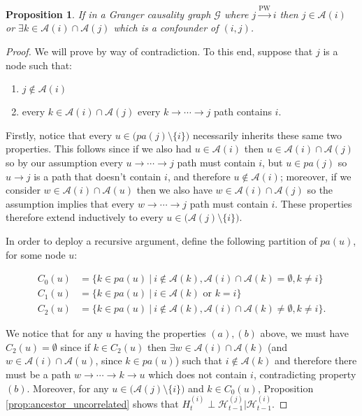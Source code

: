 \documentclass{statsoc}
\def\pwgc{\overset{\text{PW}}{\rightarrow}}  %
\def\gcg{\mathcal{G}}  %
\def\H{\mathcal{H}}  %
\newcommand{\pa}[1]{pa(#1)}  %
\newcommand{\anc}[1]{\mathcal{A}(#1)}  %
\newcommand{\gcgpath}[2]{#1 \rightarrow \cdots \rightarrow #2}  %
\newtheorem{proposition}{Proposition}
\def\H{\mathcal{H}}  %
\begin{document}
\begin{proposition}
  \label{prop:ancestor_properties}
  If in a Granger causality graph $\gcg$ where $j \pwgc i$ then
  $j \in \anc{i}$ or $\exists k \in \anc{i} \cap\anc{j}$ which is a
  confounder of $(i, j)$.
\end{proposition}

\begin{proof}
  We will prove by way of contradiction.  To this end, suppose that
  $j$ is a node such that:

  \begin{enumerate}[label=(\alph*)]
    \item{$j \not \in \anc{i}$}
    \item{every $k \in \anc{i} \cap \anc{j}$ every
        $k \rightarrow \cdots \rightarrow j$ path contains $i$.}
  \end{enumerate}

  Firstly, notice that every $u \in \big(\pa{j} \setminus \{i\}\big)$
  necessarily inherits these same two properties.  This follows since
  if we also had $u \in \anc{i}$ then $u \in \anc{i} \cap \anc{j}$ so by our
  assumption every $u \rightarrow \cdots \rightarrow j$ path must contain
  $i$, but $u \in \pa{j}$ so $u \rightarrow j$ is a path that doesn't contain
  $i$, and therefore $u \not\in \anc{i}$; moreover, if we consider
  $w \in \anc{i} \cap \anc{u}$ then we also have
  $w \in \anc{i} \cap \anc{j}$ so the assumption implies that every
  $w \rightarrow \cdots \rightarrow j$ path must contain $i$.  These properties therefore
  extend inductively to every $u \in \big(\anc{j} \setminus \{i\}\big)$.

  In order to deploy a recursive argument, define the following
  partition of $\pa{u}$, for some node $u$:

  \begin{align*}
    C_0(u) &= \{k \in \pa{u}\ |\ i \not\in \anc{k}, \anc{i} \cap \anc{k} = \emptyset, k \ne i\}\\
    C_1(u) &= \{k \in \pa{u}\ |\ i \in \anc{k} \text{ or } k = i\}\\
    C_2(u) &= \{k \in \pa{u}\ |\ i \not\in \anc{k}, \anc{i} \cap \anc{k} \ne \emptyset, k \ne i\}.
  \end{align*}

  We notice that for any $u$ having the properties $(a), (b)$ above,
  we must have $C_2(u) = \emptyset$ since if $k \in C_2(u)$ then
  $\exists w \in \anc{i} \cap \anc{k}$ (and
  $w \in \anc{i} \cap \anc{u}$, since $k \in \pa{u}$) such that
  $i \not \in \anc{k}$ and therefore there must be a path
  $\gcgpath{w}{k} \rightarrow u$ which does not contain $i$,
  contradicting property $(b)$.  Moreover, for any
  $u \in \big(\anc{j} \setminus \{i\}\big)$ and $k \in C_0(u)$,
  Proposition \ref{prop:ancestor_uncorrelated} shows that
  $H_t^{(i)} \perp \H_{t - 1}^{(j)} | \H_{t - 1}^{(i)}$.


\end{proof}
\end{document}
